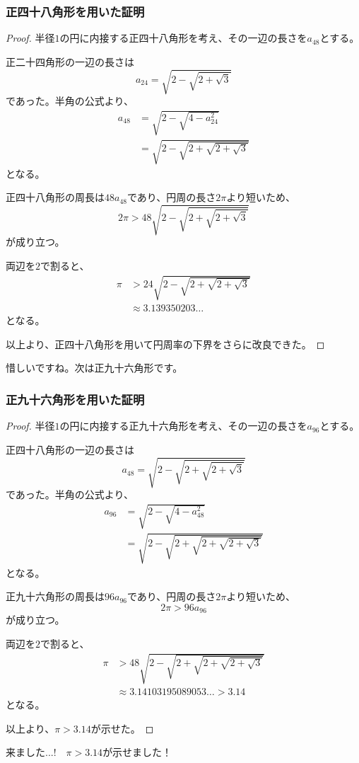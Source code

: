 \documentclass[dvipdfmx]{jlreq}
\begin{document}
\subsubsection{正四十八角形を用いた証明}
\begin{proof}
半径$1$の円に内接する正四十八角形を考え、その一辺の長さを$a_{48}$とする。

正二十四角形の一辺の長さは
\[
a_{24}=\sqrt{2-\sqrt{2+\sqrt{3}}}
\]
であった。半角の公式より、
\[
\begin{aligned}
a_{48}
&=\sqrt{2-\sqrt{4-a_{24}^2}}\\
&=\sqrt{2-\sqrt{2+\sqrt{2+\sqrt{3}}}}
\end{aligned}
\]
となる。

正四十八角形の周長は$48a_{48}$であり、円周の長さ$2\pi$より短いため、
\[
2\pi>48\sqrt{2-\sqrt{2+\sqrt{2+\sqrt{3}}}}
\]
が成り立つ。

両辺を$2$で割ると、
\[
\begin{aligned}
\pi
&>24\sqrt{2-\sqrt{2+\sqrt{2+\sqrt{3}}}}\\
&\approx3.139350203\dots
\end{aligned}
\]
となる。

以上より、正四十八角形を用いて円周率の下界をさらに改良できた。
\end{proof}
惜しいですね。次は正九十六角形です。
\subsubsection{正九十六角形を用いた証明}
\begin{proof}
半径$1$の円に内接する正九十六角形を考え、その一辺の長さを$a_{96}$とする。

正四十八角形の一辺の長さは
\[
a_{48}=\sqrt{2-\sqrt{2+\sqrt{2+\sqrt{3}}}}
\]
であった。半角の公式より、
\[
\begin{aligned}
a_{96}
&=\sqrt{2-\sqrt{4-a_{48}^2}}\\
&=\sqrt{2-\sqrt{2+\sqrt{2+\sqrt{2+\sqrt{3}}}}}
\end{aligned}
\]
となる。

正九十六角形の周長は$96a_{96}$であり、円周の長さ$2\pi$より短いため、
\[
2\pi>96a_{96}
\]
が成り立つ。

両辺を$2$で割ると、
\[
\begin{aligned}
\pi&>48\sqrt{2-\sqrt{2+\sqrt{2+\sqrt{2+\sqrt{3}}}}}\\
&\approx3.14103195089053\dots>3.14
\end{aligned}
\]
となる。

以上より、$\pi>3.14$が示せた。
\end{proof}
来ました...!　$\pi>3.14$が示せました！
\end{document}
